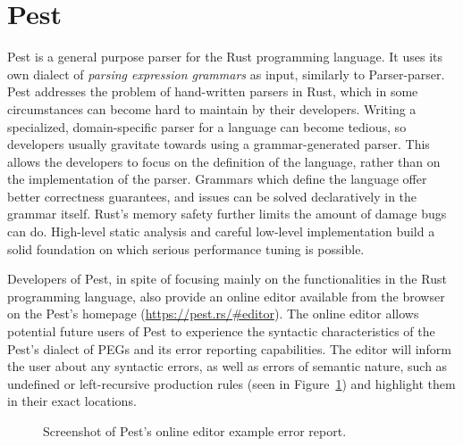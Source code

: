 \documentclass[english,bachelors,forcepolishlogotype]{wizthesis}
\newcommand{\paraphrase}[1]{#1}
\newcommand{\thisproject}{Parser-parser}
\begin{document}
\section*{Pest}

Pest \cite{pest} is a general purpose parser for the Rust \cite{rust}
programming language. It uses its own dialect of \emph{parsing expression
grammars} as input, similarly to \thisproject{}. Pest addresses the problem of
hand-written parsers in Rust, which in some circumstances can become hard to
maintain by their developers. Writing a specialized, domain-specific parser for
a language can become tedious, so developers usually gravitate towards using a
grammar-generated parser. This allows the developers to focus on the definition
of the language, rather than on the implementation of the parser.
\paraphrase{Grammars which define the language offer better correctness
guarantees, and issues can be solved declaratively in the grammar itself. Rust's
memory safety further limits the amount of damage bugs can do. High-level static
analysis and careful low-level implementation build a solid foundation on which
serious performance tuning is possible.}

Developers of Pest, in spite of focusing mainly on the functionalities in the
Rust programming language, also provide an online editor available from the
browser on the Pest's homepage (\url{https://pest.rs/#editor}). The online
editor allows potential future users of Pest to experience the syntactic
characteristics of the Pest's dialect of PEGs and its error reporting
capabilities. The editor will inform the user about any syntactic errors, as
well as errors of semantic nature, such as undefined or left-recursive
production rules (seen in Figure~\ref{fig:pest-error}) and highlight them in
their exact locations.

\begin{figure}[ht]
  \centering
  \caption{Screenshot of Pest's online editor example error report.}
  \label{fig:pest-error}
\end{figure}
\end{document}
